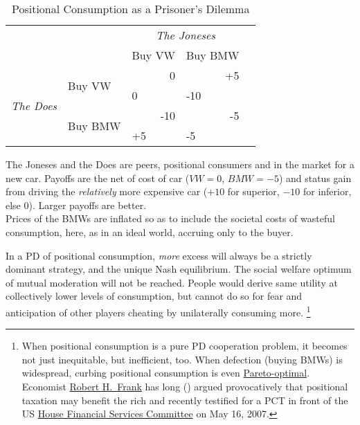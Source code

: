 \begin{table}
	\caption{Positional Consumption as a Prisoner's Dilemma}
	\label{tab:Positional-PD}
	\begin{center}
	\begin{tabular}{m{1cm}m{}m{}m{}m{}}
		& & \multicolumn{2}{c}{\emph{The Joneses}} \\
		& &Buy VW & Buy BMW\\
		\cline{3-4}
		\multicolumn{1}{c}{\multirow{4}{*}{\emph{The Does}}} & \multirow{2}{2,3cm}{Buy VW} & 		\multicolumn{1}{|r|}{0} & \multicolumn{1}{r|}{+5}\\
		\multicolumn{1}{c}{} & \multicolumn{1}{c}{}& \multicolumn{1}{|l|}{0} & \multicolumn{1}{l|}{-10}\\
		\cline{3-4}
		\multicolumn{1}{c}{} & \multirow{2}{2,3cm}{Buy BMW} & \multicolumn{1}{|r|}{-10} & \multicolumn{1}{r|}{-5}\\
		\multicolumn{1}{c}{} & \multicolumn{1}{c}{}& \multicolumn{1}{|l|}{+5} & \multicolumn{1}{l|}{-5}\\
		\cline{3-4}
	\end{tabular}
	\end{center}
	\scriptsize{The Joneses and the Does are peers, positional consumers and in the market for a new car.
Payoffs are the net of cost of car ($VW=0$, $BMW=-5$) and status gain from driving the \emph{relatively} more expensive car ($+10$ for superior, $-10$ for inferior, else $0$).
Larger payoffs are better.\\
	Prices of the BMWs are inflated so as to include the societal costs of wasteful consumption, here, as in an ideal world, accruing only to the buyer.}
\end{table}

In a \gls{PD} of positional consumption, \emph{more} excess will always be a strictly dominant strategy, and the unique Nash equilibrium.
The social welfare optimum of mutual moderation will not be reached.
People would derive same utility at collectively lower levels of consumption, but cannot do so for fear and anticipation of other players cheating by unilaterally consuming more.
\footnote{
	When positional consumption is a pure \gls{PD} cooperation problem, it becomes not just inequitable, but inefficient, too.
	When defection (buying BMWs) is widespread, curbing positional consumption is even \hyperref[sec:Pareto]{Pareto-optimal}.
	Economist \hyperref[http://www.robert-h-frank.com]{Robert H.~Frank} has long (\citeyear{Frank1987}) argued provocatively that positional taxation may benefit the rich and recently testified for a \gls{PCT} in front of the US \hyperref[http://financialservices.house.gov/]{House Financial Services Committee} on May 16, 2007.
}

